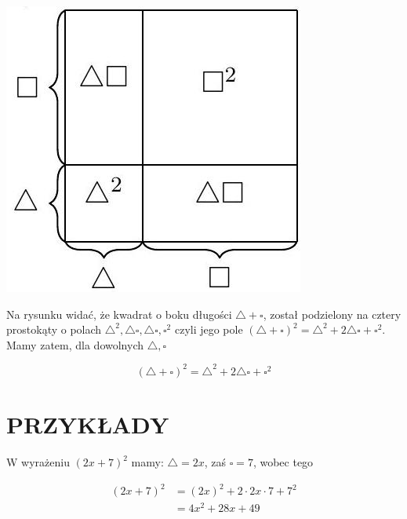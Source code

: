 \documentclass[10pt]{article}
\begin{document}
\begin{center}
\includegraphics[max width=\textwidth]{2024_11_21_71f62bd117d375398909g-069}
\end{center}

Na rysunku widać, że kwadrat o boku długości \(\triangle+\square\), został podzielony na cztery prostokąty o polach \(\triangle^{2}, \triangle \square, \triangle \square, \square^{2}\) czyli jego pole \((\triangle+\square)^{2}=\triangle^{2}+2 \triangle \square+\square^{2}\). Mamy zatem, dla dowolnych \(\triangle, \square\)

\[
(\triangle+\square)^{2}=\triangle^{2}+2 \triangle \square+\square^{2}
\]

\section*{PRZYKŁADY}
W wyrażeniu \((2 x+7)^{2}\) mamy: \(\triangle=2 x\), zaś \(\square=7\), wobec tego

\[
\begin{aligned}
(2 x+7)^{2} & =(2 x)^{2}+2 \cdot 2 x \cdot 7+7^{2} \\
& =4 x^{2}+28 x+49
\end{aligned}
\]
\end{document}
